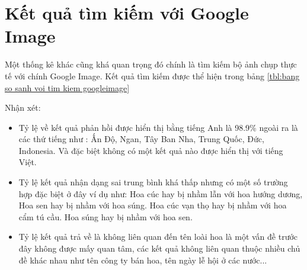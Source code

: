 \documentclass[12pt]{report}
\begin{document}
		\section{Kết quả tìm kiếm với Google Image}
		Một thống kê khác cũng khá quan trọng đó chính là tìm kiếm bộ ảnh chụp thực tế với chính Google Image.
		Kết quả tìm kiếm được thể hiện trong bảng \ref{tbl:bang so sanh voi tim kiem googleimage}
		
		Nhận xét:
		\begin{itemize}
			\item Tỷ lệ về kết quả phản hồi được hiển thị bằng tiếng Anh là 98.9\% ngoài ra là các thứ tiếng như : Ấn Độ, Ngan, Tây Ban Nha, Trung Quốc, Đức, Indonesia. Và đặc biệt không có một kết quả nào được hiển thị với tiếng Việt.
			\item Tỷ lệ kết quả nhận dạng sai trung bình khá thấp nhưng có một số trường hợp đặc biệt ở đây ví dụ như: Hoa cúc hay bị nhầm lẫn với hoa hướng dương, Hoa sen hay bị nhầm với hoa súng. 
			Hoa cúc vạn thọ hay bị nhầm với hoa cẩm tú cầu. Hoa súng hay bị nhầm với hoa sen.
			\item Tỷ lệ kết quả trả về là không liên quan đến tên loài hoa là một vấn đề trước đây không được mấy quan tâm, các kết quả không liên quan thuộc nhiều chủ đề khác nhau như tên công ty bán hoa, tên ngày lễ hội ở các nước...
		\end{itemize}
\end{document}

